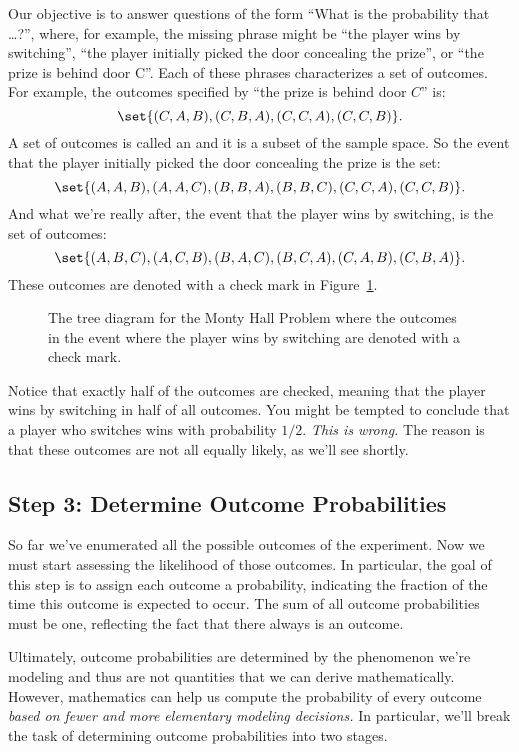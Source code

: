 Our objective is to answer questions of the form ``What is the
probability that \dots ?'', where, for example, the missing phrase
might be ``the player wins by switching'', ``the player initially
picked the door concealing the prize'', or ``the prize is behind door
C''.  Each of these phrases characterizes a set of outcomes. For
example, the outcomes specified by ``the prize is behind door $C$''
is:
%
\[
    \set{(C, A, B), (C, B, A), (C, C, A), (C, C, B)}.
\]
%
A set of outcomes is called an  and it is a subset of the
sample space.  So the event that the player initially picked the door
concealing the prize is the set:
%
\[
    \set{(A, A, B), (A, A, C), (B, B, A), (B, B, C), (C, C, A), (C, C, B)}.
\]
%
And what we're really after, the event that the player wins by
switching, is the set of outcomes:
%
\[
    \set{(A, B, C), (A, C, B), (B, A, C), (B, C, A), (C, A, B), (C, B, A)}.
\]
These outcomes are denoted with a check mark in Figure~\ref{fig:14A4}.

\begin{figure}


\caption{The tree diagram for the Monty Hall Problem where the
  outcomes in the event where the player wins by switching are denoted
  with a check mark.}

\label{fig:14A4}

\end{figure}

Notice that exactly half of the outcomes are checked, meaning that the
player wins by switching in half of all outcomes.  You might be
tempted to conclude that a player who switches wins with probability
$1/2$.  \emph{This is wrong.}  The reason is that these outcomes are
not all equally likely, as we'll see shortly.

\subsection{Step 3: Determine Outcome Probabilities}

So far we've enumerated all the possible outcomes of the experiment.  Now
we must start assessing the likelihood of those outcomes.  In particular,
the goal of this step is to assign each outcome a probability, indicating
the fraction of the time this outcome is expected to occur.  The sum of
all outcome probabilities must be one, reflecting the fact that there
always is an outcome.

Ultimately, outcome probabilities are determined by the phenomenon
we're modeling and thus are not quantities that we can derive
mathematically.  However, mathematics can help us compute the
probability of every outcome \emph{based on fewer and more
elementary modeling decisions.}  In particular, we'll break the task
of determining outcome probabilities into two stages.

